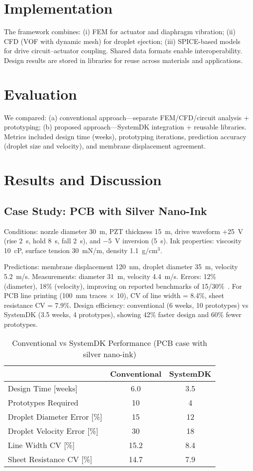 \documentclass[conference]{IEEEtran}
\begin{document}
\section{Implementation}
The framework combines: (i) FEM for actuator and diaphragm vibration; (ii) CFD (VOF with dynamic mesh) for droplet ejection; (iii) SPICE-based models for drive circuit--actuator coupling. Shared data formats enable interoperability. Design results are stored in libraries for reuse across materials and applications.

\section{Evaluation}
We compared: (a) conventional approach---separate FEM/CFD/circuit analysis + prototyping; (b) proposed approach---SystemDK integration + reusable libraries. Metrics included design time (weeks), prototyping iterations, prediction accuracy (droplet size and velocity), and membrane displacement agreement.

\section{Results and Discussion}
\subsection{Case Study: PCB with Silver Nano-Ink}
Conditions: nozzle diameter 30~\textmu m, PZT thickness 15~\textmu m, drive waveform +25~V (rise 2~\textmu s, hold 8~\textmu s, fall 2~\textmu s), and $-5$~V inversion (5~\textmu s). Ink properties: viscosity 10~cP, surface tension 30~mN/m, density 1.1~g/cm$^3$.

Predictions: membrane displacement 120~nm, droplet diameter 35~\textmu m, velocity 5.2~m/s. Measurements: diameter 31~\textmu m, velocity 4.4~m/s. Errors: 12\% (diameter), 18\% (velocity), improving on reported benchmarks of 15/30\%~\cite{boccio2003,lei2012}. For PCB line printing (100~mm traces $\times$ 10), CV of line width = 8.4\%, sheet resistance CV = 7.9\%. Design efficiency: conventional (6 weeks, 10 prototypes) vs SystemDK (3.5 weeks, 4 prototypes), showing 42\% faster design and 60\% fewer prototypes.

\begin{table}[t]
\centering
\caption{Conventional vs SystemDK Performance (PCB case with silver nano-ink)}
\begin{tabular}{lcc}
\toprule
 & Conventional & SystemDK \\
\midrule
Design Time [weeks]        & 6.0   & 3.5 \\
Prototypes Required        & 10    & 4   \\
Droplet Diameter Error [\%] & 15    & 12  \\
Droplet Velocity Error [\%] & 30    & 18  \\
Line Width CV [\%]         & 15.2  & 8.4 \\
Sheet Resistance CV [\%]   & 14.7  & 7.9 \\
\bottomrule
\end{tabular}
\label{tab:comparison}
\end{table}
\end{document}

